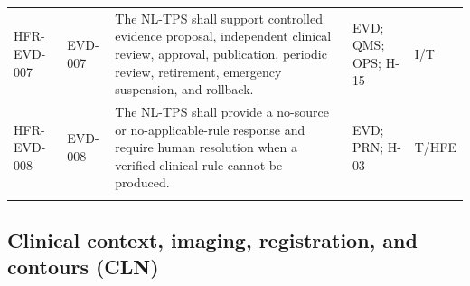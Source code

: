 \documentclass[11pt,letterpaper]{article}
\begin{document}
\begin{scriptsize}
\begin{longtable}{@{}L{0.14\textwidth}L{0.09\textwidth}L{0.47\textwidth}L{0.15\textwidth}L{0.07\textwidth}@{}}
\addlinespace[2pt]
\mbox{HFR-EVD-007} & \mbox{EVD-007} & The NL-TPS shall support controlled evidence proposal, independent clinical review, approval, publication, periodic review, retirement, emergency suspension, and rollback. & EVD; QMS; OPS; H-15 & I\slash\allowbreak{}T \\
\addlinespace[2pt]
\mbox{HFR-EVD-008} & \mbox{EVD-008} & The NL-TPS shall provide a no-source or no-applicable-rule response and require human resolution when a verified clinical rule cannot be produced. & EVD; PRN; H-03 & T\slash\allowbreak{}HFE \\
\addlinespace[2pt]
\end{longtable}
\end{scriptsize}

\subsection{Clinical context, imaging, registration, and contours (CLN)}
\end{document}
